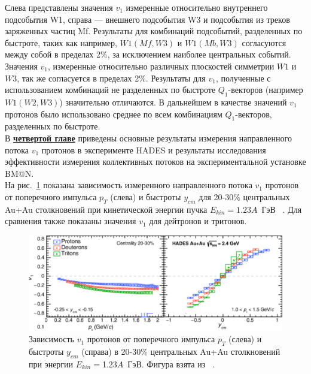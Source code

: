 Слева представлены значения $v_1$ измеренные относительно внутреннего подсобытия W1, справа --- внешнего подсобытия W3 и подсобытия из треков заряженных частиц Mf. 
Результаты для комбинаций подсобытий, разделенных по быстроте, таких как например, $W1(Mf,W3)$ и $W1(Mb,W3)$ согласуются между собой в пределах 2\%,
за исключением наиболее центральных событий. Значения $v_1$, измеренные относительно различных плоскостей симметрии $W1$ и $W3$, так же согласуется в пределах 2\%.
Результаты для $v_1$, полученные с использованием комбинаций не разделенных по быстроте $Q_1$-векторов (например $W1(W2,W3)$) значительно отличаются.
В дальнейшем в качестве значений $v_1$ протонов было использовано среднее по всем комбинациям $Q_1$-векторов, разделенных по быстроте.\\
В  \underline{\textbf{четвертой главе}} приведены основные 
результаты измерения направленного потока $v_1$ протонов в  эксперименте HADES и результаты исследования эффективности измерения коллективных потоков на
экспериментальной установке BM@N.\\
На рис.~\ref{fig:hades_prl} показана зависимость измеренного направленного потока  $v_1$ протонов от поперечного импульса $p_T$ (слева) и быстроты $y_{cm}$ для 20-30\%
центральных Au+Au столкновений при кинетической энергии пучка $E_{kin}=1.23A$~ГэВ ~\cite{HADES:2020lob}. Для сравнения также показаны значения $v_1$   для дейтронов и тритонов.

\begin{figure}[h]
\begin{center}
\includegraphics[width=0.75\linewidth]{images/HADES_prl.png}
\caption{Зависимость  $v_1$ протонов от  поперечного импульса  $p_T$ (слева) и  быстроты $y_{cm}$ (справа) в 20-30\% центральных Au+Au столкновений при
  энергии $E_{kin}=$1.23$A$~ГэВ. Фигура взята из ~\cite{HADES:2020lob}.}
\label{fig:hades_prl}
\end{center}
\end{figure}

